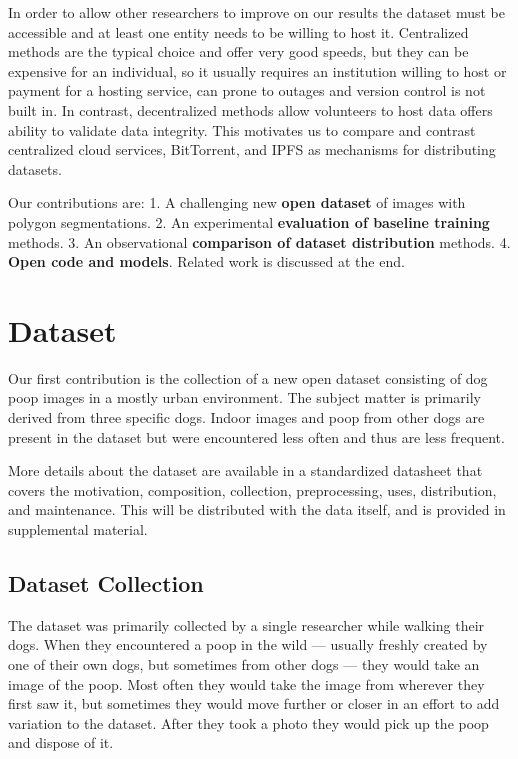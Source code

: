 \documentclass[10pt,twocolumn,letterpaper]{article}
\begin{document}
In order to allow other researchers to improve on our results the dataset must
be accessible and at least one entity needs to be willing to host it.
Centralized methods are the typical choice and offer very good speeds, 
but they can be expensive for an individual, so it usually requires an
institution willing to host or payment for a hosting service,
can prone to outages and version control is not built in.
In contrast, decentralized methods allow volunteers to host data offers ability
to validate data integrity. 
This motivates us to compare and contrast centralized cloud services,
BitTorrent, and IPFS as mechanisms for distributing datasets.



Our contributions are:
1. A challenging new \textbf{open dataset} of images with polygon segmentations.
2. An experimental \textbf{evaluation of baseline training} methods.
3. An observational \textbf{comparison of dataset distribution} methods.
4. \textbf{Open code and models}.
Related work is discussed at the end.


\section{Dataset}

Our first contribution is the collection of a new open dataset consisting of
dog poop images in a mostly urban environment. The subject matter is primarily
derived from three specific dogs. Indoor images and poop from other dogs are
present in the dataset but were encountered less often and thus are less
frequent.

More details about the dataset are available in a standardized datasheet
\cite{gebru_datasheets_2021} that covers the motivation, composition,
collection, preprocessing, uses, distribution, and maintenance. This will be
distributed with the data itself, and is provided in supplemental material.

\subsection{Dataset Collection}

The dataset was primarily collected by a single researcher while walking their
dogs. When they encountered a poop in the wild --- usually freshly created by
one of their own dogs, but sometimes from other dogs --- they would take an
image of the poop. Most often they would take the image from wherever they
first saw it, but sometimes they would move further or closer in an effort to
add variation to the dataset. After they took a photo they would pick up the
poop and dispose of it.
\end{document}
